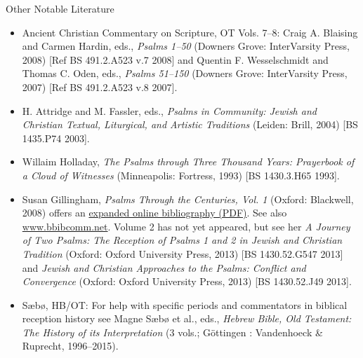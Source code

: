 \documentclass[titlepage]{article}
\begin{document}
\noindent Other Notable Literature

\begin{itemize}

	\item Ancient Christian Commentary on Scripture, OT Vols. 7--8:
	  Craig A. Blaising and Carmen Hardin, eds., \emph{Psalms 1--50} (Downers Grove: InterVarsity Press, 2008) [Ref BS 491.2.A523 v.7 2008] and
	  Quentin F. Wesselschmidt and Thomas C. Oden, eds., \emph{Psalms 51--150} (Downers Grove: InterVarsity Press, 2007) [Ref BS 491.2.A523 v.8 2007].

	\item H. Attridge and M. Fassler, eds., \emph{Psalms in Community: Jewish and Christian Textual, Liturgical, and Artistic Traditions} (Leiden: Brill, 2004) [BS 1435.P74 2003].

	\item Willaim Holladay, \emph{The Psalms through Three Thousand Years: Prayerbook of a Cloud of Witnesses} (Minneapolis: Fortress, 1993) [BS 1430.3.H65 1993].

	\item Susan Gillingham, \emph{Psalms Through the Centuries, Vol. 1} (Oxford: Blackwell, 2008) offers an \href{http://www.blackwellpublishing.com/pdf/9780631218555.pdf}{expanded online bibliography (PDF)}. See also \href{http://www.bbibcomm.net/}{www.bbibcomm.net}. Volume 2 has not yet appeared, but see her \emph{A Journey of Two Psalms: The Reception of Psalms 1 and 2 in Jewish and Christian Tradition} (Oxford: Oxford University Press, 2013) [BS 1430.52.G547 2013] and \emph{Jewish and Christian Approaches to the Psalms: Conflict and Convergence} (Oxford: Oxford University Press, 2013) [BS 1430.52.J49 2013].

	\item Sæbø, HB/OT: For help with specific periods and commentators in biblical reception history see Magne Sæbø et al., eds., \emph{Hebrew Bible, Old Testament: The History of its Interpretation} (3 vols.; Göttingen : Vandenhoeck \& Ruprecht, 1996--2015).

\end{itemize}
\end{document}
